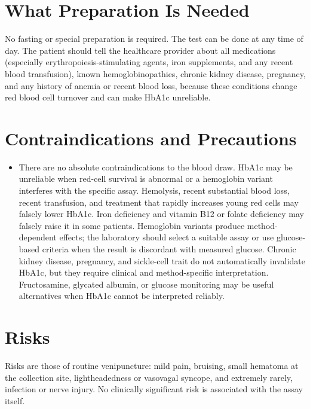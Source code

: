 \section*{What Preparation Is Needed}
No fasting or special preparation is required. The test can be done at any time of day. The patient should tell the healthcare provider about all medications (especially erythropoiesis-stimulating agents, iron supplements, and any recent blood transfusion), known hemoglobinopathies, chronic kidney disease, pregnancy, and any history of anemia or recent blood loss, because these conditions change red blood cell turnover and can make HbA1c unreliable.

\section*{Contraindications and Precautions}
\begin{itemize}
  \item There are no absolute contraindications to the blood draw. HbA1c may be unreliable when red-cell survival is abnormal or a hemoglobin variant interferes with the specific assay. Hemolysis, recent substantial blood loss, recent transfusion, and treatment that rapidly increases young red cells may falsely lower HbA1c. Iron deficiency and vitamin B12 or folate deficiency may falsely raise it in some patients. Hemoglobin variants produce method-dependent effects; the laboratory should select a suitable assay or use glucose-based criteria when the result is discordant with measured glucose. Chronic kidney disease, pregnancy, and sickle-cell trait do not automatically invalidate HbA1c, but they require clinical and method-specific interpretation. Fructosamine, glycated albumin, or glucose monitoring may be useful alternatives when HbA1c cannot be interpreted reliably.
\end{itemize}
\section*{Risks}
Risks are those of routine venipuncture: mild pain, bruising, small hematoma at the collection site, lightheadedness or vasovagal syncope, and extremely rarely, infection or nerve injury. No clinically significant risk is associated with the assay itself.

